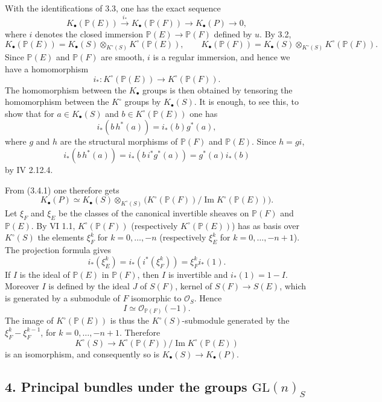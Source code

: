 \documentclass[11pt]{article}
\begin{document}
With the identifications of 3.3, one has the exact sequence
\[
 K_\bullet(\mathbb P(E))\xrightarrow{i_*}K_\bullet(\mathbb P(F))\longrightarrow K_\bullet(P)\longrightarrow 0,
\tag{3.4.1}
\]
where $i$ denotes the closed immersion $\mathbb P(E)\to\mathbb P(F)$ defined by $u$. By 3.2,
\[
 K_\bullet(\mathbb P(E))=K_\bullet(S)\otimes_{K^\circ(S)}K^\circ(\mathbb P(E)),
\qquad
 K_\bullet(\mathbb P(F))=K_\bullet(S)\otimes_{K^\circ(S)}K^\circ(\mathbb P(F)).
\]
Since $\mathbb P(E)$ and $\mathbb P(F)$ are smooth, $i$ is a regular immersion, and hence we have a homomorphism
\[
 i_*:K^\circ(\mathbb P(E))\longrightarrow K^\circ(\mathbb P(F)).
\]
The homomorphism between the $K_\bullet$ groups is then obtained by tensoring the homomorphism between the $K^\circ$ groups by $K_\bullet(S)$. It is enough, to see this, to show that for $a\in K_\bullet(S)$ and $b\in K^\circ(\mathbb P(E))$ one has
\[
 i_*(b\,h^*(a))=i_*(b)g^*(a),
\]
where $g$ and $h$ are the structural morphisms of $\mathbb P(F)$ and $\mathbb P(E)$. Since $h=gi$,
\[
 i_*(b\,h^*(a))=i_*(b\,i^*g^*(a))=g^*(a)i_*(b)
\]
by IV 2.12.4.

From (3.4.1) one therefore gets
\[
 K_\bullet(P)\simeq K_\bullet(S)\otimes_{K^\circ(S)}
 \bigl(K^\circ(\mathbb P(F))/\operatorname{Im}K^\circ(\mathbb P(E))\bigr).
\]
Let $\xi_F$ and $\xi_E$ be the classes of the canonical invertible sheaves on $\mathbb P(F)$ and $\mathbb P(E)$. By VI 1.1, $K^\circ(\mathbb P(F))$ (respectively $K^\circ(\mathbb P(E))$) has as basis over $K^\circ(S)$ the elements $\xi_F^k$ for $k=0,\ldots,-n$ (respectively $\xi_E^k$ for $k=0,\ldots,-n+1$). The projection formula gives
\[
 i_*(\xi_E^k)=i_*(i^*(\xi_F^k))=\xi_F^k i_*(1).
\]
If $I$ is the ideal of $\mathbb P(E)$ in $\mathbb P(F)$, then $I$ is invertible and $i_*(1)=1-I$. Moreover $I$ is defined by the ideal $J$ of $S(F)$, kernel of $S(F)\to S(E)$, which is generated by a submodule of $F$ isomorphic to $\mathcal O_S$. Hence
\[
 I\simeq \mathcal O_{\mathbb P(F)}(-1).
\]
The image of $K^\circ(\mathbb P(E))$ is thus the $K^\circ(S)$-submodule generated by the $\xi_F^k-\xi_F^{k-1}$, for $k=0,\ldots,-n+1$. Therefore
\[
 K^\circ(S)\longrightarrow K^\circ(\mathbb P(F))/\operatorname{Im}K^\circ(\mathbb P(E))
\]
is an isomorphism, and consequently so is $K_\bullet(S)\to K_\bullet(P)$.

\subsection*{4. Principal bundles under the groups $\mathrm{GL}(n)_S$}
\end{document}
